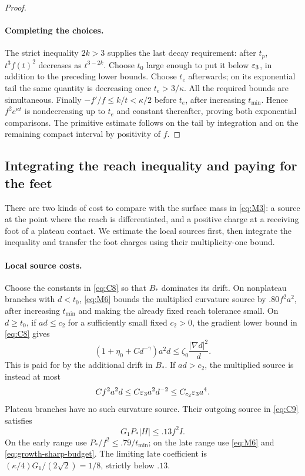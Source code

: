 \begin{proof}
\paragraph{Completing the choices.}
The strict inequality $2k>3$ supplies the last decay requirement:
after $t_p$, $t^3f(t)^2$ decreases as $t^{3-2k}$.  Choose $t_0$ large
enough to put it below $\varepsilon_3$, in addition to the preceding lower
bounds.  Choose $t_e$ afterwards; on its exponential tail the same
quantity is decreasing once $t_e>3/\kappa$.  All the required bounds
are simultaneous.  Finally $-f'/f\le k/t<\kappa/2$ before $t_e$,
after increasing $t_{\min}$.  Hence $f^2e^{\kappa t}$ is nondecreasing
up to $t_e$ and constant thereafter, proving both exponential
comparisons.  The primitive estimate follows on the tail by integration
and on the remaining compact interval by positivity of $f$.
\end{proof}

\subsection{Integrating the reach inequality and paying for the feet}

There are two kinds of cost to compare with the surface mass in
\eqref{eq:M3}: a source at the point where the reach is differentiated,
and a positive charge at a receiving foot of a plateau contact.
We estimate the local sources first, then integrate the inequality and
transfer the foot charges using their multiplicity-one bound.

\paragraph{Local source costs.}
Choose the constants in \eqref{eq:C8} so that $B_*$ dominates its drift.
On nonplateau branches with $d<t_0$, \eqref{eq:M6} bounds the multiplied
curvature source by $.80 f^2a^2$, after increasing $t_{\min}$ and making
the already fixed reach tolerance small.  On $d\ge t_0$, if
$ad\le c_2$ for a sufficiently small fixed $c_2>0$, the gradient lower
bound in \eqref{eq:C8} gives
\[
 (1+\eta_0+Cd^{-\gamma})a^2d
 \le\zeta_0\frac{|\nabla d|^2}{d}.
\]
This is paid for by the additional drift in $B_*$.  If $ad>c_2$,
the multiplied source is instead at most
\[
 C f^2a^2d\le C\varepsilon_3 a^2d^{-2}
 \le C_{c_2}\varepsilon_3 a^4.
\]
Plateau branches have no such curvature source.  Their outgoing source
in \eqref{eq:C9} satisfies
\[
 G_1P_*|H|\le .13 f^2 I.
\]
On the early range use $P_*/f^2\le .79/t_{\min}$; on the late range
use \eqref{eq:M6} and \eqref{eq:growth-sharp-budget}.  The limiting
late coefficient is
$(\kappa/4)G_1/(2\sqrt2)=1/8$, strictly below $.13$.

